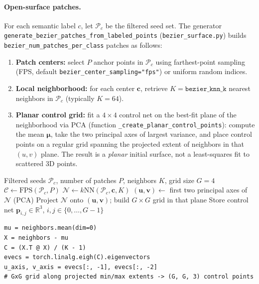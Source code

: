 \documentclass{report}
\newcommand{\filepath}[1]{\nolinkurl{#1}}
\begin{document}
\paragraph{Open-surface patches.}
For each semantic label $c$, let $\mathcal{P}_c$ be the filtered seed set. The generator \texttt{generate\_bezier\_patches\_from\_labeled\_points} (\filepath{bezier\_surface.py}) builds \texttt{bezier\_num\_patches\_per\_class} patches as follows:
\begin{enumerate}
    \item \textbf{Patch centers:} select $P$ anchor points in $\mathcal{P}_c$ using farthest-point sampling (FPS, default \texttt{bezier\_center\_sampling="fps"}) or uniform random indices.
    \item \textbf{Local neighborhood:} for each center $\mathbf{c}$, retrieve $K=\texttt{bezier\_knn\_k}$ nearest neighbors in $\mathcal{P}_c$ (typically $K=64$).
    \item \textbf{Planar control grid:} fit a $4\times 4$ control net on the best-fit plane of the neighborhood via PCA (function \texttt{\_create\_planar\_control\_points}): compute the mean $\boldsymbol{\mu}$, take the two principal axes of largest variance, and place control points on a regular grid spanning the projected extent of neighbors in that $(u,v)$ plane. The result is a \emph{planar} initial surface, not a least-squares fit to scattered 3D points.
\end{enumerate}

\begin{algorithm}[htbp]
\caption{Open-mode B\'ezier control-point initialization (per class, per patch)}
\label{alg:bezier_cp_open}
\begin{algorithmic}[1]
\Require Filtered seeds $\mathcal{P}_c$, number of patches $P$, neighbors $K$, grid size $G{=}4$
\State $\mathcal{C} \gets \mathrm{FPS}(\mathcal{P}_c, P)$ 
    \State $\mathcal{N} \gets k\mathrm{NN}(\mathcal{P}_c, \mathbf{c}, K)$
    \State $(\mathbf{u},\mathbf{v}) \gets$ first two principal axes of $\mathcal{N}$ (PCA)
    \State Project $\mathcal{N}$ onto $(\mathbf{u},\mathbf{v})$; build $G\times G$ grid in that plane
    \State Store control net $\mathbf{p}_{i,j}\in\mathbb{R}^3$, $i,j\in\{0,\ldots,G{-}1\}$
\EndFor
\end{algorithmic}
\end{algorithm}

\begin{lstlisting}[caption={Planar control grid from a $k$-NN neighborhood (\filepath{bezier\_surface.py}).},label={lst:planar_cp}]
mu = neighbors.mean(dim=0)
X = neighbors - mu
C = (X.T @ X) / (K - 1)
evecs = torch.linalg.eigh(C).eigenvectors
u_axis, v_axis = evecs[:, -1], evecs[:, -2]
# GxG grid along projected min/max extents -> (G, G, 3) control points
\end{lstlisting}
\end{document}
